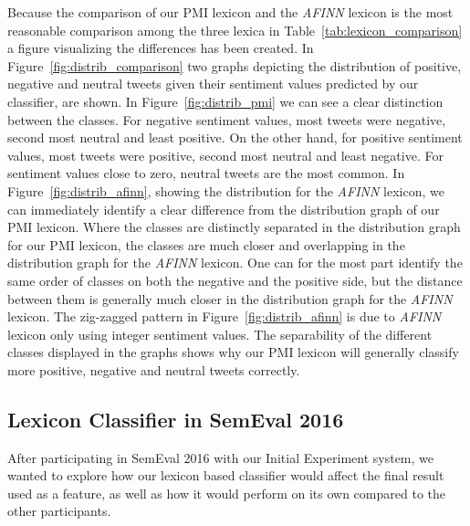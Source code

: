Because the comparison of our PMI lexicon and the \textit{AFINN} lexicon is the most reasonable comparison among the three lexica in Table~\ref{tab:lexicon_comparison} a figure visualizing the differences has been created. In Figure~\ref{fig:distrib_comparison} two graphs depicting the distribution of positive, negative and neutral tweets given their sentiment values predicted by our classifier, are shown. In Figure~\ref{fig:distrib_pmi} we can see a clear distinction between the classes. For negative sentiment values, most tweets were negative, second most neutral and least positive. On the other hand, for positive sentiment values, most tweets were positive, second most neutral and least negative. For sentiment values close to zero, neutral tweets are the most common. In Figure~\ref{fig:distrib_afinn}, showing the distribution for the \textit{AFINN} lexicon, we can immediately identify a clear difference from the distribution graph of our PMI lexicon. Where the classes are distinctly separated in the distribution graph for our PMI lexicon, the classes are much closer and overlapping in the distribution graph for the \textit{AFINN} lexicon. One can for the most part identify the same order of classes on both the negative and the positive side, but the distance between them is generally much closer in the distribution graph for the \textit{AFINN} lexicon. The zig-zagged pattern in Figure~\ref{fig:distrib_afinn} is due to \textit{AFINN} lexicon only using integer sentiment values. The separability of the different classes displayed in the graphs shows why our PMI lexicon will generally classify more positive, negative and neutral tweets correctly.


\subsection{Lexicon Classifier in SemEval 2016}
After participating in SemEval 2016 with our Initial Experiment system, we wanted to explore how our lexicon based classifier would affect the final result used as a feature, as well as how it would perform on its own compared to the other participants. \\

